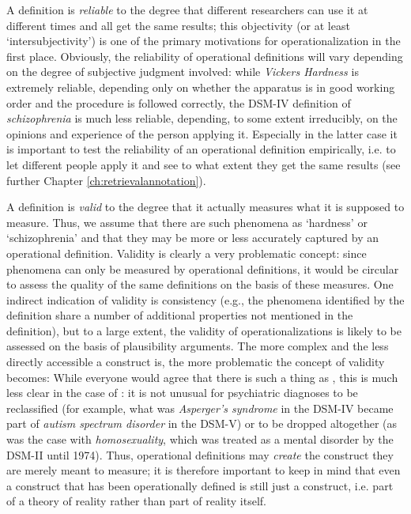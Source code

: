 A definition is \emph{reliable} to the degree that different researchers can use it at different times and all get the same results; this objectivity (or at least `intersubjectivity') is one of the primary motivations for operationalization in the first place. Obviously, the reliability of operational definitions will vary depending on the degree of subjective judgment involved: while \emph{Vickers Hardness} is extremely reliable, depending only on whether the apparatus is in good working order and the procedure is followed correctly, the DSM-IV definition of \textit{schizophrenia} is much less reliable, depending, to some extent irreducibly, on the opinions and experience of the person applying it. Especially in the latter case it is important to test the reliability of an operational definition empirically, i.e. to let different people apply it and see to what extent they get the same results (see further Chapter \ref{ch:retrievalannotation}).

A definition is \emph{valid} to the degree that it actually measures what it is supposed to measure. Thus, we assume that there are such phenomena as `hardness' or `schizophrenia' and that they may be more or less accurately captured by an operational definition. Validity is clearly a very problematic concept: since phenomena can only be measured by operational definitions, it would be circular to assess the quality of the same definitions on the basis of these measures. One indirect indication of validity is consistency (e.g., the phenomena identified by the definition share a number of additional properties not mentioned in the definition), but to a large extent, the validity of operationalizations is likely to be assessed on the basis of plausibility arguments. The more complex and the less directly accessible a construct is, the more problematic the concept of validity becomes: While everyone would agree that there is such a thing as , this is much less clear in the case of : it is not unusual for psychiatric diagnoses to be reclassified (for example, what was \textit{Asperger's syndrome} in the DSM-IV became part of \textit{autism spectrum disorder} in the DSM-V) or to be dropped altogether (as was the case with \textit{homosexuality}, which was treated as a mental disorder by the DSM-II until 1974). Thus, operational definitions may \emph{create} the construct they are merely meant to measure; it is therefore important to keep in mind that even a construct that has been operationally defined is still just a construct, i.e. part of a theory of reality rather than part of reality itself.

